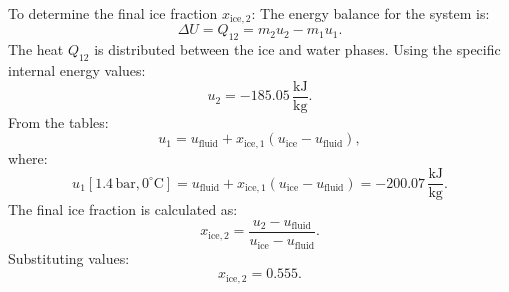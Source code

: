 To determine the final ice fraction \( x_{\text{ice},2} \):  
The energy balance for the system is:  
\[
\Delta U = Q_{12} = m_2 u_2 - m_1 u_1.
\]  
The heat \( Q_{12} \) is distributed between the ice and water phases. Using the specific internal energy values:  
\[
u_2 = -185.05 \, \frac{\text{kJ}}{\text{kg}}.
\]  
From the tables:  
\[
u_1 = u_{\text{fluid}} + x_{\text{ice},1} (u_{\text{ice}} - u_{\text{fluid}}),
\]  
where:  
\[
u_1[1.4 \, \text{bar}, 0^\circ\text{C}] = u_{\text{fluid}} + x_{\text{ice},1} (u_{\text{ice}} - u_{\text{fluid}}) = -200.07 \, \frac{\text{kJ}}{\text{kg}}.
\]  
The final ice fraction is calculated as:  
\[
x_{\text{ice},2} = \frac{u_2 - u_{\text{fluid}}}{u_{\text{ice}} - u_{\text{fluid}}}.
\]  
Substituting values:  
\[
x_{\text{ice},2} = 0.555.
\]